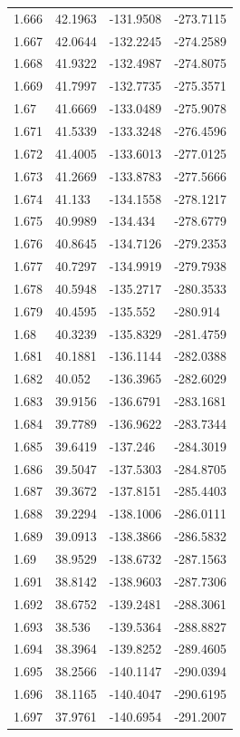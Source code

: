 \begin{tabular}{llll}
1.666 & 42.1963 & -131.9508 & -273.7115 \\
1.667 & 42.0644 & -132.2245 & -274.2589 \\
1.668 & 41.9322 & -132.4987 & -274.8075 \\
1.669 & 41.7997 & -132.7735 & -275.3571 \\
1.67 & 41.6669 & -133.0489 & -275.9078 \\
1.671 & 41.5339 & -133.3248 & -276.4596 \\
1.672 & 41.4005 & -133.6013 & -277.0125 \\
1.673 & 41.2669 & -133.8783 & -277.5666 \\
1.674 & 41.133 & -134.1558 & -278.1217 \\
1.675 & 40.9989 & -134.434 & -278.6779 \\
1.676 & 40.8645 & -134.7126 & -279.2353 \\
1.677 & 40.7297 & -134.9919 & -279.7938 \\
1.678 & 40.5948 & -135.2717 & -280.3533 \\
1.679 & 40.4595 & -135.552 & -280.914 \\
1.68 & 40.3239 & -135.8329 & -281.4759 \\
1.681 & 40.1881 & -136.1144 & -282.0388 \\
1.682 & 40.052 & -136.3965 & -282.6029 \\
1.683 & 39.9156 & -136.6791 & -283.1681 \\
1.684 & 39.7789 & -136.9622 & -283.7344 \\
1.685 & 39.6419 & -137.246 & -284.3019 \\
1.686 & 39.5047 & -137.5303 & -284.8705 \\
1.687 & 39.3672 & -137.8151 & -285.4403 \\
1.688 & 39.2294 & -138.1006 & -286.0111 \\
1.689 & 39.0913 & -138.3866 & -286.5832 \\
1.69 & 38.9529 & -138.6732 & -287.1563 \\
1.691 & 38.8142 & -138.9603 & -287.7306 \\
1.692 & 38.6752 & -139.2481 & -288.3061 \\
1.693 & 38.536 & -139.5364 & -288.8827 \\
1.694 & 38.3964 & -139.8252 & -289.4605 \\
1.695 & 38.2566 & -140.1147 & -290.0394 \\
1.696 & 38.1165 & -140.4047 & -290.6195 \\
1.697 & 37.9761 & -140.6954 & -291.2007 \\

\end{tabular}
